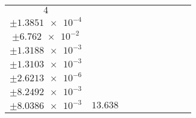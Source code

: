 \documentclass[8pt]{article}
\begin{document}
\begin{longtable}[l]{c c c c c c c c c}
$\num{4}$ & \begin{tabular}[c]{@{}c@{}}$\num{0.11874}$ \\ $\pm\num{1.3851e-4}$\end{tabular} & \begin{tabular}[c]{@{}c@{}}$\num{-1.392}$ \\ $\pm\num{6.762e-2}$\end{tabular} & \begin{tabular}[c]{@{}c@{}}$\num{6.631}$ \\ $\pm\num{1.3188e-3}$\end{tabular} & \begin{tabular}[c]{@{}c@{}}$\num{951.19}$ \\ $\pm\num{1.3103e-3}$\end{tabular} & \begin{tabular}[c]{@{}c@{}}$\num{1.9029}$ \\ $\pm\num{2.6213e-6}$\end{tabular} & \begin{tabular}[c]{@{}c@{}}$\num{6.2876}$ \\ $\pm\num{8.2492e-3}$\end{tabular} & \begin{tabular}[c]{@{}c@{}}$\num{6.1951}$ \\ $\pm\num{8.0386e-3}$\end{tabular} & $\num{13.638}$\\
\bottomrule
\end{longtable}
\end{document}
